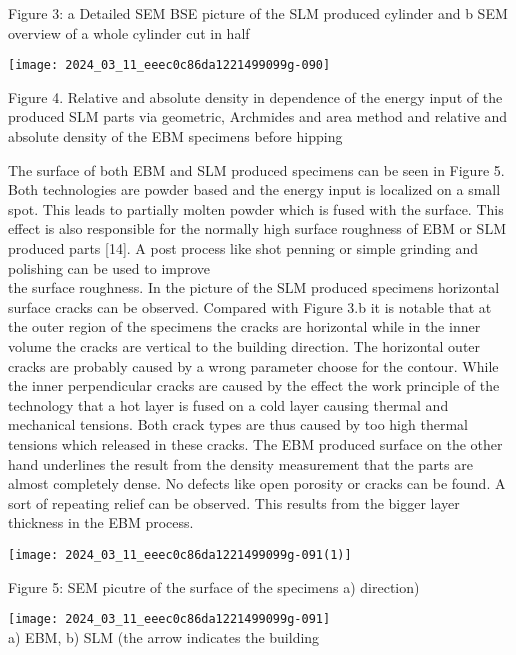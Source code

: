\documentclass[10pt]{article}
\begin{document}
Figure 3: a Detailed SEM BSE picture of the SLM produced cylinder and b SEM overview of a whole cylinder cut in half

\begin{center}
\texttt{[image: 2024\_03\_11\_eeec0c86da1221499099g-090]}
\end{center}

Figure 4. Relative and absolute density in dependence of the energy input of the produced SLM parts via geometric, Archmides and area method and relative and absolute density of the EBM specimens before hipping

The surface of both EBM and SLM produced specimens can be seen in Figure 5. Both technologies are powder based and the energy input is localized on a small spot. This leads to partially molten powder which is fused with the surface. This effect is also responsible for the normally high surface roughness of EBM or SLM produced parts [14]. A post process like shot penning or simple grinding and polishing can be used to improve\\
the surface roughness. In the picture of the SLM produced specimens horizontal surface cracks can be observed. Compared with Figure 3.b it is notable that at the outer region of the specimens the cracks are horizontal while in the inner volume the cracks are vertical to the building direction. The horizontal outer cracks are probably caused by a wrong parameter choose for the contour. While the inner perpendicular cracks are caused by the effect the work principle of the technology that a hot layer is fused on a cold layer causing thermal and mechanical tensions. Both crack types are thus caused by too high thermal tensions which released in these cracks. The EBM produced surface on the other hand underlines the result from the density measurement that the parts are almost completely dense. No defects like open porosity or cracks can be found. A sort of repeating relief can be observed. This results from the bigger layer thickness in the EBM process.

\begin{center}
\texttt{[image: 2024\_03\_11\_eeec0c86da1221499099g-091(1)]}
\end{center}

Figure 5: SEM picutre of the surface of the specimens a) direction)

\texttt{[image: 2024\_03\_11\_eeec0c86da1221499099g-091]}\\
a) EBM, b) SLM (the arrow indicates the building
\end{document}
